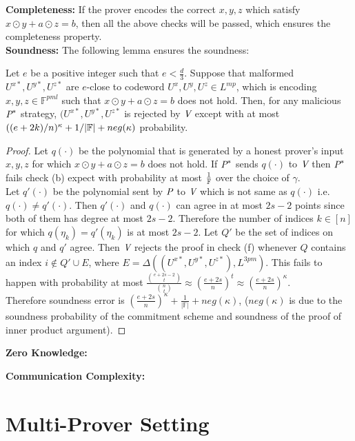 \textbf{Completeness:} If the prover encodes the correct $x,y,z$ which satisfy $x\odot y + a\odot z=b$, then all the above checks will be passed, which ensures the completeness property.\\

\textbf{Soundness:} The following lemma ensures the soundness:

\begin{lemma}
		Let $e$ be a positive integer such that $e < \frac{d}{3}$. Suppose that malformed $U^{x*}, U^{y*}, U^{z*}$ are $e$-close to codeword $U^x, U^y, U^z \in L^{mp}$, which is encoding $x,y,z\in \mathbb{F}^{pml}$ such that $x\odot y + a\odot z = b$ does not hold. Then, for any malicious $\P^*$ strategy, $(U^{x*}, U^{y*}, U^{z*}$ is rejected by $\V$ except with at most $((e + 2k)/n) ^{\kappa} +1/|\bbF|+neg(\kappa)$ probability.
\end{lemma}

\begin{proof}
	Let $q(\cdot)$ be the polynomial that is generated by a honest prover's input $x,y,z$ for which $x\odot y + a\odot z=b$ does not hold. If $\P^*$ sends $q(\cdot)$ to $\V$ then $\P^*$ fails check (b) expect with probability at most $\frac{1}{\bbF}$ over the choice of $\gamma$.\\
	Let $q'(\cdot)$ be the polynomial sent by $\P$ to $\V$ which is not same as $q(\cdot)$ i.e. $q(\cdot)\neq q'(\cdot)$. Then $q'(\cdot)$ and $q(\cdot)$ can agree in at most $2s-2$ points since both of them has degree at most $2s-2$. Therefore the number of indices $k\in [n]$ for which $q(\eta_k)=q'(\eta_k)$ is at most $2s-2$. Let $Q'$ be the set of indices on which $q$ and $q'$ agree. Then $\V$ rejects the proof in check (f) whenever $Q$ contains an index $i\notin Q' \cup E$, where $E=\Delta((U^{x*}, U^{y*}, U^{z*}), L^{3pm})$. This fails to happen with probability at most $\frac{\binom{e+2s-2}{t}}{\binom{n}{t}}\approx (\frac{e+2s}{n})^t\approx (\frac{e+2s}{n})^{\kappa}$.\\
	Therefore soundness error is $(\frac{e+2s}{n})^{\kappa}+\frac{1}{|\mathbb{F}|}+neg(\kappa)$, ($neg(\kappa)$ is due to the soundness probability of the commitment scheme and soundness of the proof of inner product argument).
\end{proof}
\textbf{Zero Knowledge:}

\textbf{Communication Complexity:}
\section{Multi-Prover Setting}

